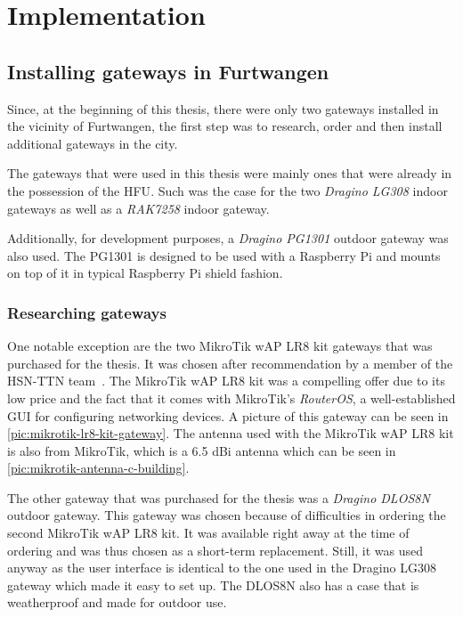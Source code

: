 \chapter{Implementation}

\section{Installing gateways in Furtwangen}

Since, at the beginning of this thesis, there were only two gateways installed in the vicinity of Furtwangen, the first step was to research, order and then install additional gateways in the city.

The gateways that were used in this thesis were mainly ones that were already in the possession of the \ac{HFU}.
Such was the case for the two \emph{Dragino LG308} indoor gateways as well as a \emph{RAK7258} indoor gateway.

Additionally, for development purposes, a \emph{Dragino PG1301} outdoor gateway was also used.
The PG1301 is designed to be used with a Raspberry Pi and mounts on top of it in typical Raspberry Pi shield fashion.

\subsection{Researching gateways}

One notable exception are the two MikroTik wAP LR8 kit gateways that was purchased for the thesis.
It was chosen after recommendation by a member of the \ac{HSN-TTN} team~\cite{noauthor_eingesetzte_nodate}.
The MikroTik wAP LR8 kit was a compelling offer due to its low price and the fact that it comes with MikroTik's \emph{RouterOS}, a well-established GUI for configuring networking devices.
A picture of this gateway can be seen in \cref{pic:mikrotik-lr8-kit-gateway}.
The antenna used with the MikroTik wAP LR8 kit is also from MikroTik, which is a 6.5 dBi antenna which can be seen in \cref{pic:mikrotik-antenna-c-building}.

The other gateway that was purchased for the thesis was a \emph{Dragino DLOS8N} outdoor gateway.
This gateway was chosen because of difficulties in ordering the second MikroTik wAP LR8 kit.
It was available right away at the time of ordering and was thus chosen as a short-term replacement.
Still, it was used anyway as the user interface is identical to the one used in the Dragino LG308 gateway which made it easy to set up.
The DLOS8N also has a case that is weatherproof and made for outdoor use.

